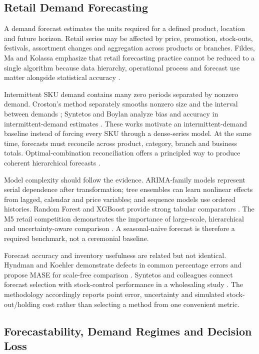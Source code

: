 \subsection{Retail Demand Forecasting}

A demand forecast estimates the units required for a defined product, location
and future horizon. Retail series may be affected by price, promotion,
stock-outs, festivals, assortment changes and aggregation across products or
branches. Fildes, Ma and Kolassa emphasize that retail forecasting practice
cannot be reduced to a single algorithm because data hierarchy, operational
process and forecast use matter alongside statistical accuracy
\cite{fildes2022retail}.

Intermittent SKU demand contains many zero periods separated by nonzero demand.
Croston's method separately smooths nonzero size and the interval between
demands \cite{croston1972intermittent}; Syntetos and Boylan analyze bias and
accuracy in intermittent-demand estimates \cite{syntetos2005intermittent}.
These works motivate an intermittent-demand baseline instead of forcing every
SKU through a dense-series model. At the same time, forecasts must reconcile
across product, category, branch and business totals. Optimal-combination
reconciliation offers a principled way to produce coherent hierarchical
forecasts \cite{hyndman2011hierarchical}.

Model complexity should follow the evidence. ARIMA-family models represent
serial dependence after transformation; tree ensembles can learn nonlinear
effects from lagged, calendar and price variables; and sequence models use
ordered histories. Random Forest and XGBoost provide strong tabular comparators
\cite{breiman2001rf,chen2016xgboost}. The M5 retail competition demonstrates the
importance of large-scale, hierarchical and uncertainty-aware comparison
\cite{makridakis2022m5}. A seasonal-naive forecast is therefore a required
benchmark, not a ceremonial baseline.

Forecast accuracy and inventory usefulness are related but not identical.
Hyndman and Koehler demonstrate defects in common percentage errors and propose
MASE for scale-free comparison \cite{hyndman2006accuracy}. Syntetos and
colleagues connect forecast selection with stock-control performance in a
wholesaling study \cite{syntetos2010stock}. The methodology accordingly reports
point error, uncertainty and simulated stock-out/holding cost rather than
selecting a method from one convenient metric.

\subsection{Forecastability, Demand Regimes and Decision Loss}

